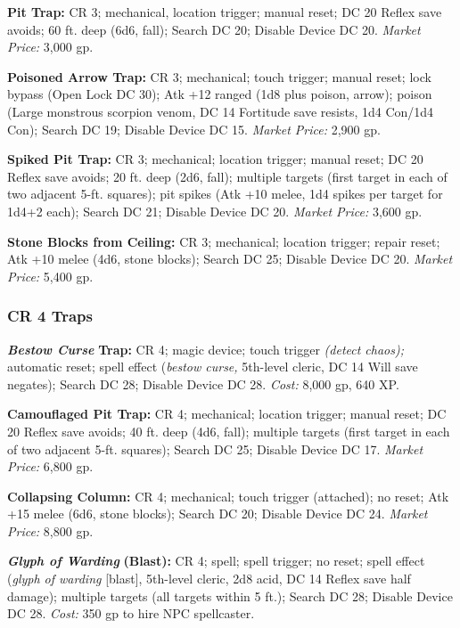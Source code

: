 \documentclass{article}
\begin{document}
\textbf{Pit Trap:} CR 3; mechanical, location trigger; manual reset; DC 20 Reflex 
save avoids; 60 ft. deep (6d6, fall); Search DC 20; Disable Device DC 20. \textit{Market 
Price: }3,000 gp.

\textbf{Poisoned Arrow Trap:} CR 3; mechanical; touch trigger; manual reset; lock 
bypass (Open Lock DC 30); Atk +12 ranged (1d8 plus poison, arrow); poison (Large 
monstrous scorpion venom, DC 14 Fortitude save resists, 1d4 Con/1d4 Con); Search 
DC 19; Disable Device DC 15. \textit{Market Price: }2,900 gp.

\textbf{Spiked Pit Trap: }CR 3; mechanical; location trigger; manual reset; DC 
20 Reflex save avoids; 20 ft. deep (2d6, fall); multiple targets (first target 
in each of two adjacent 5-ft. squares); pit spikes (Atk +10 melee, 1d4 spikes per 
target for 1d4+2 each); Search DC 21; Disable Device DC 20. \textit{Market Price: 
}3,600 gp.

\textbf{Stone Blocks from Ceiling: }CR 3; mechanical; location trigger; repair 
reset; Atk +10 melee (4d6, stone blocks); Search DC 25; Disable Device DC 20. \textit{Market 
Price: }5,400 gp.

\vspace{12pt}
\subsubsection*{\textbf{CR 4 Traps}}

\textit{\textbf{Bestow Curse }}\textbf{Trap: }CR 4; magic device; touch trigger 
\textit{(detect chaos); }automatic reset; spell effect (\textit{bestow curse, }5th-level 
cleric, DC 14 Will save negates); Search DC 28; Disable Device DC 28. \textit{Cost: 
}8,000 gp, 640 XP.

\textbf{Camouflaged Pit Trap: }CR 4; mechanical; location trigger; manual reset; 
DC 20 Reflex save avoids; 40 ft. deep (4d6, fall); multiple targets (first target 
in each of two adjacent 5-ft. squares); Search DC 25; Disable Device DC 17. \textit{Market 
Price: }6,800 gp. 

\textbf{Collapsing Column:} CR 4; mechanical; touch trigger (attached); no reset; 
Atk +15 melee (6d6, stone blocks); Search DC 20; Disable Device DC 24. \textit{Market 
Price: }8,800 gp.

\textit{\textbf{Glyph of Warding }}\textbf{(Blast): }CR 4; spell; spell trigger; 
no reset; spell effect (\textit{glyph of warding }[blast], 5th-level cleric, 2d8 
acid, DC 14 Reflex save half damage); multiple targets (all targets within 5 ft.); 
Search DC 28; Disable Device DC 28. \textit{Cost: }350 gp to hire NPC spellcaster.
\end{document}
